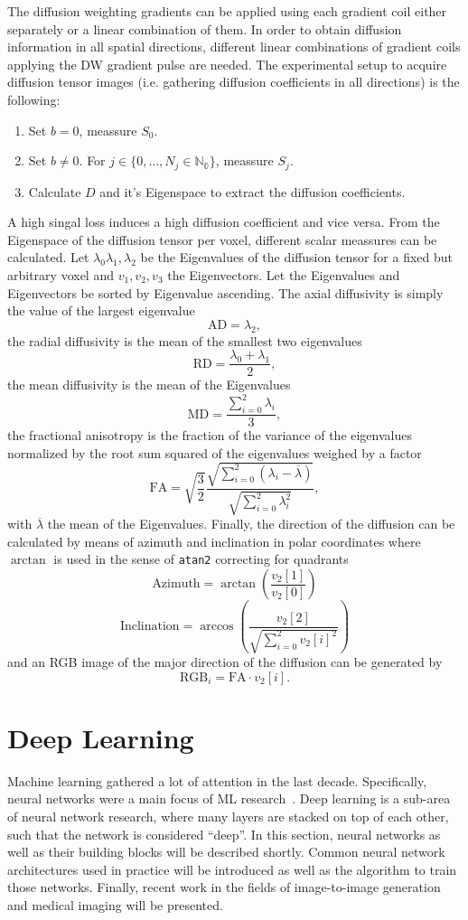 The diffusion weighting gradients can be applied using each gradient coil either separately or a linear combination of them.
In order to obtain diffusion information in all spatial directions, different linear combinations of gradient coils applying the DW gradient pulse are needed.
The experimental setup to acquire diffusion tensor images (i.e. gathering diffusion coefficients in all directions) is the following:
\begin{enumerate}
 \item Set $b = 0$, meassure $S_0$.
 \item Set $b \neq 0$. For $j \in \{0, \dots, N_j \in \mathbb{N_0}\}$, meassure $S_j$.
 \item Calculate $D$ and it's Eigenspace to extract the diffusion coefficients.
\end{enumerate}
A high singal loss induces a high diffusion coefficient and vice versa.
From the Eigenspace of the diffusion tensor per voxel, different scalar meassures can be calculated.
Let $\lambda_0 \lambda_1, \lambda_2$ be the Eigenvalues of the diffusion tensor for a fixed but arbitrary voxel and $v_1, v_2, v_3$ the Eigenvectors.
Let the Eigenvalues and Eigenvectors be sorted by Eigenvalue ascending.
The axial diffusivity is simply the value of the largest eigenvalue
\[ \text{AD} = \lambda_2, \]
the radial diffusivity is the mean of the smallest two eigenvalues
\[ \text{RD} = \frac{\lambda_0 + \lambda_1}{2}, \]
the mean diffusivity is the mean of the Eigenvalues
\[ \text{MD} = \frac{\sum_{i = 0}^2 \lambda_i}{3}, \]
the fractional anisotropy is the fraction of the variance of the eigenvalues normalized by the root sum squared of the eigenvalues weighed by a factor
\[ \text{FA} = \sqrt{\frac{3}{2}} \frac{ \sqrt{\sum_{i=0}^2 (\lambda_i - \overline{\lambda})} }{ \sqrt{\sum_{i=0}^2 \lambda_i^2} }, \]
with $\overline{\lambda}$ the mean of the Eigenvalues.
Finally, the direction of the diffusion can be calculated by means of azimuth and inclination in polar coordinates where $\arctan$ is used in the sense of \texttt{atan2} correcting for quadrants
\[ \text{Azimuth} =  \arctan\left(\frac{v_2[1]}{v_2[0]}\right) \]
\[ \text{Inclination} = \arccos\left(\frac{v_2[2]}{\sqrt{\sum_{i = 0}^2 v_2[i]^2}}\right) \]
and an RGB image of the major direction of the diffusion can be generated by
\[ \text{RGB}_i = \text{FA} \cdot v_2[i]. \]


\section{Deep Learning}
Machine learning gathered a lot of attention in the last decade.
Specifically, neural networks were a main focus of ML research~\autocite{vaswani_attention_2017, goodfellow_generative_2020, krizhevsky_imagenet_2012}.
Deep learning is a sub-area of neural network research, where many layers are stacked on top of each other, such that the network is considered ``deep''.
In this section, neural networks as well as their building blocks will be described shortly.
Common neural network architectures used in practice will be introduced as well as the algorithm to train those networks.
Finally, recent work in the fields of image-to-image generation and medical imaging will be presented.

